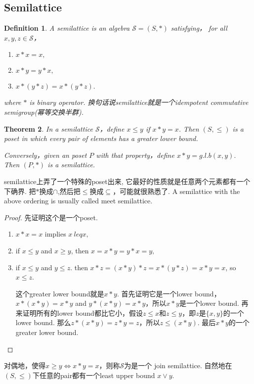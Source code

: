\documentclass{article}
\newtheorem{theorem}{Theorem}[section]
\newtheorem{definition}[theorem]{Definition}
\newcommand\slattice{\mathcal{S}}
\begin{document}
\subsection{Semilattice}
\begin{definition}
\rm A {\color{red} semilattice} is an algebra $\mathcal{S} = (S,*)$ satisfying， for all $x,y,z \in \slattice$，
\begin{enumerate}
	\item $x * x = x,$
	\item $x * y = y *x,$
	\item $x*(y*z) = x*(y*z).$
\end{enumerate}
where $*$ is binary operator.
{\color{red} 换句话说semilattice就是一个idempotent commutative semigroup(幂等交换半群)}. 
\end{definition}

\begin{theorem}
\rm In a semilattice $\slattice$，define $x \leq y$ if $x * y = x$. Then $(S,\leq)$ is a poset in which every pair of elements has a greater lower bound.

Conversely，given an poset $P$ with that property，define $x * y = g.l.b(x,y).$ Then $(P,*)$ is a semilattice.
\end{theorem}

{\color{blue} semilattice上弄了一个特殊的poset出来, 它最好的性质就是任意两个元素都有一个下确界}. 把$*$换成$\cap$,然后把$\leq$换成$\subseteq$，可能就很熟悉了. A semilattice with the above ordering is usually called {\color{red} meet semilattice}.
\begin{proof}
先证明这个是一个poset. 
\begin{enumerate}
	\item $x * x = x$ implies $x \ leq x,$
	\item if $x \leq y$ and $x \geq y$, then $x = x*y  = y*x = y,$
	\item if $x \leq y$ and $ y \leq z$. then $x *z = (x * y)*z = x *(y *z) = x * y = x$, so $x \leq z$.
	
这个greater lower bound就是$x * y$. 首先证明它是一个lower bound，$x *(x*y)=x*y$ and $y*(x*y) = x*y$，所以$x*y$是一个lower bound. 再来证明所有的lower bound都比它小，假设$z \leq x$和$z \leq y$，即$z$是$\{x,y\}$的一个lower bound. 那么$z * (x * y) = z * y = z$，所以$z \leq (x*y)$. 最后$x*y$的一个greater lower bound. 
\end{enumerate}
\end{proof}


对偶地，使得$x \geq y \iff x * y = x$，则称$\slattice$为是一个{\color{red} join semilattice}. 自然地在$(S,\leq)$下任意的pair都有一个least upper bound $x \vee y$.
\end{document}
